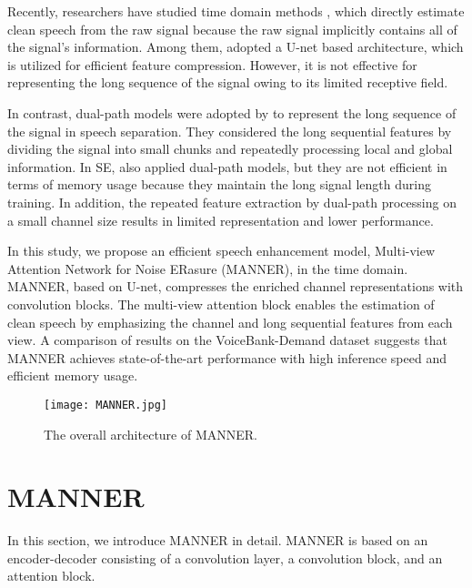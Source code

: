 \documentclass{article}
\begin{document}
Recently, researchers have studied time domain methods \cite{pandey2020dual, defossez2020real, wang2021tstnn, macartney2018improved, rethage2018wavenet, pascual2017segan, pandey2020densely, pandey2021dense, hsieh2020wavecrn}, which directly estimate clean speech from the raw signal because the raw signal implicitly contains all of the signal’s information. Among them, \cite{defossez2020real, macartney2018improved, pandey2020densely, pandey2021dense} adopted a U-net \cite{ronneberger2015u} based architecture, which is utilized for efficient feature compression. However, it is not effective for representing the long sequence of the signal owing to its limited receptive field.

In contrast, dual-path models were adopted by \cite{luo2020dual, chen2020dual, subakan2021attention} to represent the long sequence of the signal in speech separation. They considered the long sequential features by dividing the signal into small chunks and repeatedly processing local and global information. In SE, \cite{wang2021tstnn, pandey2020dual} also applied dual-path models, but they are not efficient in terms of memory usage because they maintain the long signal length during training. In addition, the repeated feature extraction by dual-path processing on a small channel size results in limited representation and lower performance.

In this study, we propose an efficient speech enhancement model, Multi-view Attention Network for Noise ERasure (MANNER), in the time domain. MANNER, based on U-net, compresses the enriched channel representations with convolution blocks. The multi-view attention block enables the estimation of clean speech by emphasizing the channel and long sequential features from each view. A comparison of results on the VoiceBank-Demand dataset suggests that MANNER achieves state-of-the-art performance with high inference speed and efficient memory usage.

\begin{figure*}[htp]
\centerline{\texttt{[image: MANNER.jpg]}}
\caption{The overall architecture of MANNER.}
\label{fig:manner}
\end{figure*}

\section{MANNER}
\label{sec:method}

In this section, we introduce MANNER in detail. MANNER is based on an encoder-decoder consisting of a convolution layer, a convolution block, and an attention block.
\end{document}
